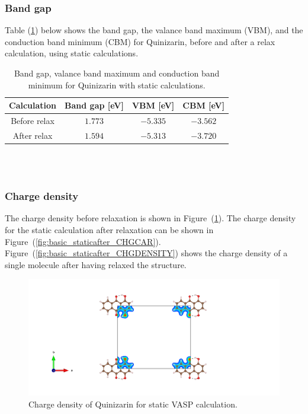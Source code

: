 \documentclass{article}
\begin{document}
      \vspace{1cm}

    \subsubsection{Band gap}

      Table (\ref{tab:bandgapquinizarin}) below shows the band gap, the valance band maximum (VBM), and the conduction band minimum (CBM) for Quinizarin, before and after a relax calculation, using static calculations. \\

      \begin{table}[H]
        \centering
        \caption{Band gap, valance band maximum and conduction band minimum for Quinizarin with static calculations. }
        \label{tab:bandgapquinizarin}
        \begin{tabular}{|c|c|c|c|}
            \hline
            Calculation & Band gap [eV] & VBM [eV] & CBM [eV]  \\
            \hline \hline
            Before relax & $1.773$ & $-5.335$ & $-3.562$ \\
            After relax & $1.594$ & $-5.313$ & $-3.720$ \\
            \hline
        \end{tabular} \\
        \hspace{0pt}\\
      \end{table}

      \vspace{1cm}

    \subsubsection{Charge density}

      The charge density before relaxation is shown in Figure~(\ref{fig:basic_staticbefore_CHGCAR}). The charge density for the static calculation after relaxation can be shown in Figure~(\ref{fig:basic_staticafter_CHGCAR}). Figure~(\ref{fig:basic_staticafter_CHGDENSITY}) shows the charge density of a single molecule after having relaxed the structure. \\

      \begin{figure}[H]
        \centering
        \includegraphics[width = \textwidth]{../fig/basic_staticbefore_CHGCAR.png}
        \caption{Charge density of Quinizarin for static VASP calculation. }
        \label{fig:basic_staticbefore_CHGCAR}
      \end{figure}
\end{document}
